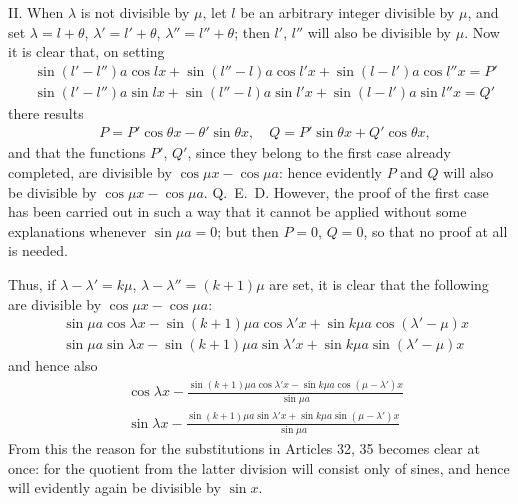 II. When $\lambda$ is not divisible by $\mu$, let $l$ be an arbitrary integer divisible by $\mu$, and set $\lambda=l+\theta$, $\lambda'=l'+\theta$, $\lambda''=l''+\theta$; then $l'$, $l''$ will also be divisible by $\mu$. Now it is clear that, on setting
\[
\begin{aligned}
&\sin(l'-l'')a\cos lx+\sin(l''-l)a\cos l'x+\sin(l-l')a\cos l''x=P'\\[5pt]
&\sin(l'-l'')a\sin lx+\sin(l''-l)a\sin l'x+\sin(l-l')a\sin l''x=Q'
\end{aligned}
\]
there results
\[
\begin{aligned}
&P=P'\cos\theta x-\theta'\sin\theta x,\quad Q=P'\sin\theta x+Q'\cos\theta x,
\end{aligned}
\]
and that the functions $P'$, $Q'$, since they belong to the first case already completed, are divisible by $\cos\mu x-\cos\mu a$: hence evidently $P$ and $Q$ will also be divisible by $\cos\mu x-\cos\mu a$. Q.~E.~D. However, the proof of the first case has been carried out in such a way that it cannot be applied without some explanations whenever $\sin\mu a=0$; but then $P=0$, $Q=0$, so that no proof at all is needed.

Thus, if $\lambda-\lambda'=k\mu$, $\lambda-\lambda''=(k+1)\mu$ are set, it is clear that the following are divisible by $\cos\mu x-\cos\mu a$:
\[
\begin{aligned}
&\sin\mu a\cos\lambda x-\sin(k+1)\mu a\cos\lambda'x+\sin k\mu a\cos(\lambda'-\mu)x\\[5pt]
&\sin\mu a\sin\lambda x-\sin(k+1)\mu a\sin\lambda'x+\sin k\mu a\sin(\lambda'-\mu)x
\end{aligned}
\]
and hence also
\[
\begin{aligned}
&\displaystyle\cos\lambda x-\frac{\sin(k+1)\mu a\cos\lambda'x-\sin k\mu a\cos(\mu-\lambda')x}{\sin\mu a}\\[5pt]
&\displaystyle\sin\lambda x-\frac{\sin(k+1)\mu a\sin\lambda'x+\sin k\mu a\sin(\mu-\lambda')x}{\sin\mu a}
\end{aligned}
\]
From this the reason for the substitutions in Articles 32, 35 becomes clear at once: for the quotient from the latter division will consist only of sines, and hence will evidently again be divisible by $\sin x$.

\endgroup
